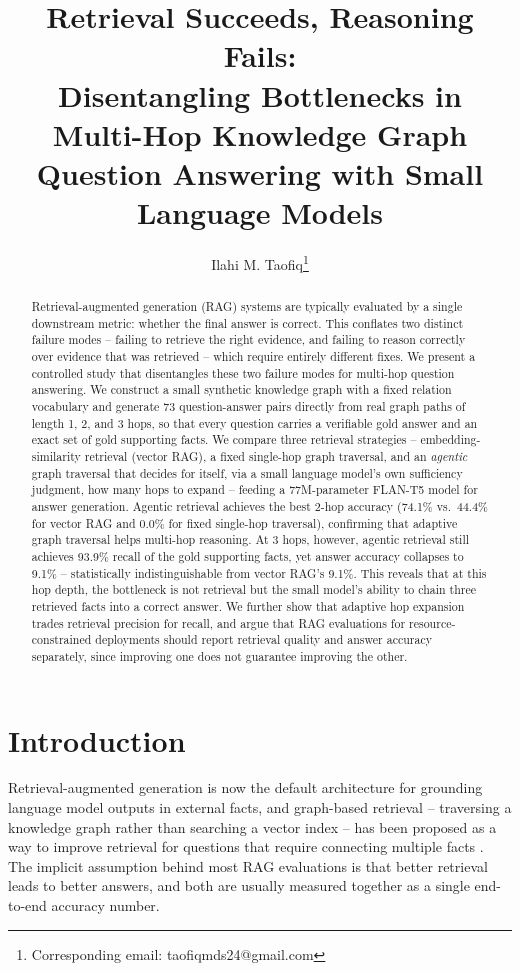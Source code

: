 \documentclass[11pt]{article}
\title{\textbf{Retrieval Succeeds, Reasoning Fails:} \\[0.4em] \textbf{Disentangling Bottlenecks in Multi-Hop Knowledge Graph \\ Question Answering with Small Language Models}}
\author[1]{Ilahi M. Taofiq\thanks{Corresponding email: taofiqmds24@gmail.com}}
\affil[1]{Independent Research}
\date{}
\begin{document}
\maketitle

\begin{abstract}
Retrieval-augmented generation (RAG) systems are typically evaluated by a single downstream metric: whether the final answer is correct. This conflates two distinct failure modes -- failing to retrieve the right evidence, and failing to reason correctly over evidence that was retrieved -- which require entirely different fixes. We present a controlled study that disentangles these two failure modes for multi-hop question answering. We construct a small synthetic knowledge graph with a fixed relation vocabulary and generate 73 question-answer pairs directly from real graph paths of length 1, 2, and 3 hops, so that every question carries a verifiable gold answer and an exact set of gold supporting facts. We compare three retrieval strategies -- embedding-similarity retrieval (vector RAG), a fixed single-hop graph traversal, and an \emph{agentic} graph traversal that decides for itself, via a small language model's own sufficiency judgment, how many hops to expand -- feeding a 77M-parameter FLAN-T5 model for answer generation. Agentic retrieval achieves the best 2-hop accuracy (74.1\% vs.\ 44.4\% for vector RAG and 0.0\% for fixed single-hop traversal), confirming that adaptive graph traversal helps multi-hop reasoning. At 3 hops, however, agentic retrieval still achieves 93.9\% recall of the gold supporting facts, yet answer accuracy collapses to 9.1\% -- statistically indistinguishable from vector RAG's 9.1\%. This reveals that at this hop depth, the bottleneck is not retrieval but the small model's ability to chain three retrieved facts into a correct answer. We further show that adaptive hop expansion trades retrieval precision for recall, and argue that RAG evaluations for resource-constrained deployments should report retrieval quality and answer accuracy separately, since improving one does not guarantee improving the other.
\end{abstract}

\section{Introduction}

Retrieval-augmented generation \citep{lewis2020rag} is now the default architecture for grounding language model outputs in external facts, and graph-based retrieval -- traversing a knowledge graph rather than searching a vector index -- has been proposed as a way to improve retrieval for questions that require connecting multiple facts \citep{edge2024graphrag}. The implicit assumption behind most RAG evaluations is that better retrieval leads to better answers, and both are usually measured together as a single end-to-end accuracy number.
\end{document}
